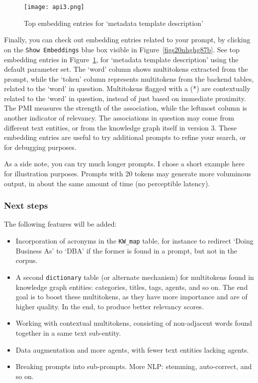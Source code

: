 \documentclass[10pt]{article}
\begin{document}
{%
\begin{figure}[H]
\centering
\texttt{[image: api3.png]}
\caption{Top embedding entries for `metadata template description'}
\label{figs20nhghg87bvzx}
\end{figure}
\vspace{1ex}
Finally, you can check out embedding entries related to your prompt, by clicking on the \texttt{Show Embeddings} blue box visible
 in Figure~\ref{figs20nhghg87b}. See top embedding entries in Figure~\ref{figs20nhghg87bvzx}, for  
`metadata template description' using the default parameter set. The `word' column shows multitokens
 extracted from the prompt, while the `token' column represents multitokens from the backend tables, related to the `word' in question.
Multitokens flagged with a (*) are contextually related to the `word' in question, instead of just based on immediate proximity.
 The \textcolor{index}{PMI} measures the strength of the association, while the leftmost column is another indicator of relevancy. The associations in question may come from different text entities, or from the knowledge graph itself in version 3. These embedding entries are useful to try additional prompts to refine your search, or for debugging purposes.

As a side note, you can try much longer prompts. I chose a short example here for illustration purposes. Prompts with 20 tokens may generate
 more voluminous output, in about the same amount of time (no perceptible latency). 

\subsubsection{Next steps}

The following features will be added:
\vspace{1ex}
\begin{itemize}
\item Incorporation of acronyms in the \texttt{KW\_map} table, for instance to redirect `Doing Business As' to `DBA' if the former is 
 found in a prompt, but not in the corpus.
\item A second \texttt{dictionary} table (or alternate mechanism) for multitokens found in knowledge graph entities: categories, titles, tags, agents, and so on. The end goal is to boost these multitokens, as they have more importance and are of higher quality.
In the end, to produce better relevancy scores.
\item Working with contextual multitokens, consisting of non-adjacent words found together in a same text sub-entity. 
\item Data augmentation and more agents, with fewer text entities lacking agents.
\item Breaking prompts into sub-prompts. More NLP: stemming, auto-correct, and so on. 
\end{itemize}


}
\end{document}

